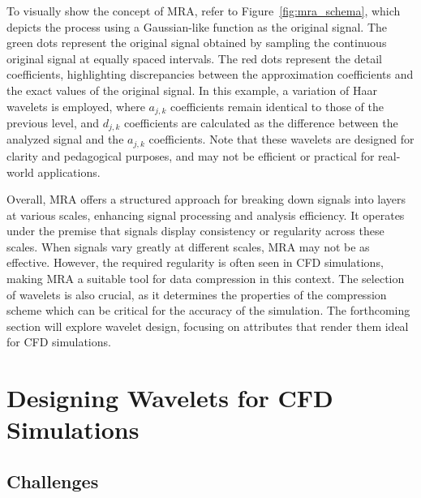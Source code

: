 To visually show the concept of MRA, refer to Figure~\ref{fig:mra_schema}, which depicts the process using a Gaussian-like function as the original signal.
The green dots represent the original signal obtained by sampling the continuous original signal at equally spaced intervals.
The red dots represent the detail coefficients, highlighting discrepancies between the approximation coefficients and the exact values of the original signal.
In this example, a variation of Haar wavelets is employed, where $a_{j,k}$ coefficients remain identical to those of the previous level, and $d_{j,k}$ coefficients are calculated as the difference between the analyzed signal and the $a_{j,k}$ coefficients.
Note that these wavelets are designed for clarity and pedagogical purposes, and may not be efficient or practical for real-world applications.

Overall, MRA offers a structured approach for breaking down signals into layers at various scales, enhancing signal processing and analysis efficiency.
It operates under the premise that signals display consistency or regularity across these scales.
When signals vary greatly at different scales, MRA may not be as effective.
However, the required regularity is often seen in CFD simulations, making MRA a suitable tool for data compression in this context.
The selection of wavelets is also crucial, as it determines the properties of the compression scheme which can be critical for the accuracy of the simulation.
The forthcoming section will explore wavelet design, focusing on attributes that render them ideal for CFD simulations.

\section{Designing Wavelets for CFD Simulations} \label{sec:wavelet_design}

\subsection{Challenges} \label{sec:challenges}

